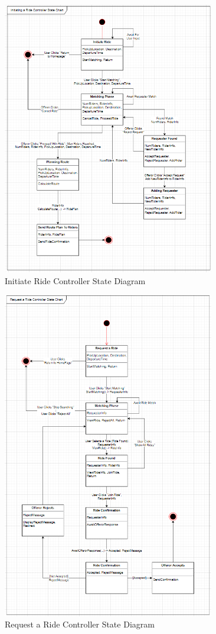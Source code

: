 \documentclass[]{article}
\begin{document}
\begin{figure}[h]
	\centering
	\includegraphics[width=25em]{assets/D3_7.PNG}
	\caption{Initiate Ride Controller State Diagram}
	\label{fig:acd}
\end{figure}
\pagebreak

\begin{figure}[h]
	\centering
	\includegraphics[width=25em]{assets/D3_8.PNG}
	\caption{Request a Ride Controller State Diagram}
	\label{fig:acd}
\end{figure}
\pagebreak
\end{document}

